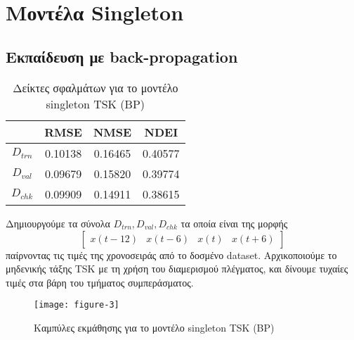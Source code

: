 \documentclass[11pt,a4paper,titlepage, oneside]{article}
\title{
	\vspace{5cm}
	\Huge{\sffamily{\hmwkClass}}\\
	\vspace{0.1em}
	\LARGE{\hmwkTitle}\\
	\vspace{7cm}
}
\author{\sffamily{\hmwkAuthorName\ - \hmwkAuthorAEM}}
\date{} %
\newlength\figureheight
\newlength\figurewidth
\begin{document}
	
	\maketitle
	
	
	
	
	
	\section{Μοντέλα Singleton}
		\subsection{Εκπαίδευση με back-propagation}
			\begin{wraptable}{r}{0.5\textwidth}
				\centering
				\begin{tabular}{c | c c c}
					 & \bfseries{RMSE} & \bfseries{NMSE} & \bfseries{NDEI} \\ \hline{}
					 $D_{trn}$ & 0.10138 & 0.16465 & 0.40577 \\ \hline
					 $D_{val}$ & 0.09679 & 0.15820 & 0.39774 \\ \hline
					 $D_{chk}$ & 0.09909 & 0.14911 & 0.38615 \\ 
				\end{tabular}
				\caption{Δείκτες σφαλμάτων για το μοντέλο singleton TSK (BP)}
				\label{tab:singleton_bp_error_metrics}
			\end{wraptable}
			Δημιουργούμε τα σύνολα $D_{trn}, D_{val}, D_{chk}$ τα οποία είναι της μορφής 
			$$ \begin{bmatrix} x(t-12) & x(t-6) & x(t) & x(t+6) \end{bmatrix} $$
			παίρνοντας τις τιμές της χρονοσειράς από το δοσμένο dataset. Αρχικοποιούμε το μηδενικής τάξης TSK με τη χρήση του διαμερισμού πλέγματος, και δίνουμε τυχαίες τιμές στα βάρη του τμήματος συμπεράσματος.\\
						
			\begin{wrapfigure}{r}{0.5\textwidth}
				\vspace{-15pt}
			 	\setlength{}
				\setlength{}	
				\centering
				\texttt{[image: figure-3]}
				\caption{Καμπύλες εκμάθησης για το μοντέλο singleton TSK (BP)}
				\label{fig:singleton_bp_learning_curves}
			\end{wrapfigure}
			
\end{document}
